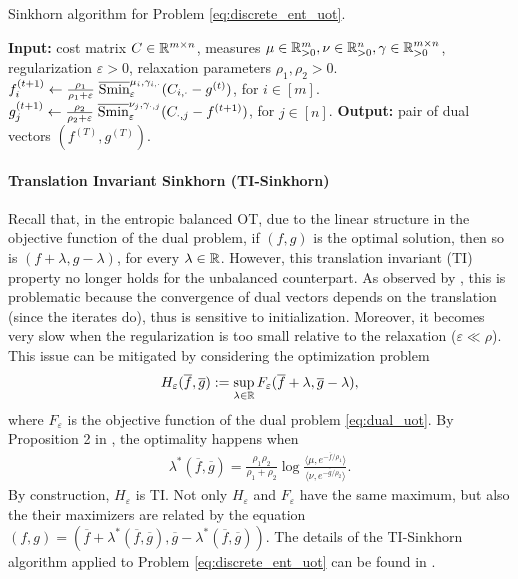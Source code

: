\begin{algorithm}[t]
  \caption{Sinkhorn algorithm for Problem \eqref{eq:discrete_ent_uot}.}
  \label{alg:Sinkhorn_algo}
\begin{algorithmic}[1]
  \STATE \textbf{Input:} cost matrix $C \in \mathbb R^{m \times n}$,
  measures $\mu \in \mathbb R^m_{> 0}, \nu \in \mathbb R^n_{> 0}, \gamma \in \mathbb R^{m \times n}_{> 0}$,
  regularization $\varepsilon > 0$, relaxation parameters $\rho_1, \rho_2 > 0$.
  \STATE $f_i^{(t+1)} \gets \frac{\rho_1}{\rho_1 + \varepsilon} \;
  \overline{\text{Smin}}^{\mu_i, \gamma_{i, \cdot}}_{\varepsilon}(C_{i, \cdot} - g^{(t)})$, for $i \in [m]$.
  \STATE $g_j^{(t+1)} \gets \frac{\rho_2}{\rho_2 + \varepsilon} \;
  \overline{\text{Smin}}^{\nu_j, \gamma_{\cdot, j}}_{\varepsilon}(C_{\cdot, j} - f^{(t+1)})$, for $j \in [n]$.
  \ENDFOR
  \STATE \textbf{Output:} pair of dual vectors $(f^{(T)}, g^{(T)})$.
\end{algorithmic}
\end{algorithm}

\paragraph{Translation Invariant Sinkhorn (TI-Sinkhorn)} Recall that, in the entropic balanced OT,
due to the linear structure in the objective function of the dual problem,
if $(f, g)$ is the optimal solution, then so is $(f + \lambda, g - \lambda)$,
for every $\lambda \in \mathbb R$. However, this translation invariant (TI) property no longer holds for
the unbalanced counterpart. As observed by \citet{Sejourne21}, this is problematic because
the convergence of dual vectors depends on the translation (since the iterates do),
thus is sensitive to initialization. Moreover, it becomes very slow when the regularization
is too small relative to the relaxation ($\varepsilon \ll \rho$).
This issue can be mitigated by considering the optimization problem
\begin{align}
  H_{\varepsilon}(\overline{f}, \overline{g}) := \sup_{\lambda \in \mathbb R}
  F_{\varepsilon}(\overline{f} + \lambda, \overline{g} - \lambda),
\end{align}
where $F_{\varepsilon}$ is the objective function of the dual problem \eqref{eq:dual_uot}.
By Proposition 2 in \citep{Sejourne21}, the optimality happens when
\begin{align}
  \label{eq:optimal_lambda}
  \lambda^*(\overline{f}, \overline{g}) = \frac{\rho_1 \rho_2}{\rho_1 + \rho_2}
  \log \frac{\langle \mu, e^{-\overline{f} / \rho_1} \rangle}
  {\langle \nu, e^{-\overline{g} / \rho_2} \rangle}.
\end{align}
By construction, $H_{\varepsilon}$ is TI. Not only $H_{\varepsilon}$ and $F_{\varepsilon}$
have the same maximum, but also the their maximizers are related by the equation
$(f, g) = (\overline{f} + \lambda^*(\overline{f}, \overline{g}), \overline{g} - \lambda^*(\overline{f}, \overline{g}))$.
The details of the TI-Sinkhorn algorithm applied to Problem \eqref{eq:discrete_ent_uot}
can be found in .

